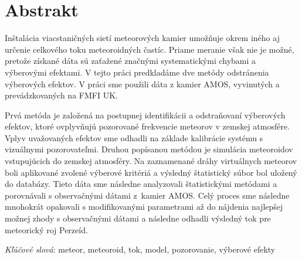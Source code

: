 \section*{Abstrakt}
    Inštalácia viacstaničných sietí meteorových kamier umožňuje okrem iného aj určenie celkového toku meteoroidných častíc.
    Priame meranie však nie je možné, pretože získané dáta sú zaťažené značnými systematickými chybami a výberovými efektami.
    V tejto práci predkladáme dve metódy odstránenia výberových efektov.
    V práci sme použili dáta z kamier AMOS, vyvinutých a prevádzkovaných na FMFI UK.

    Prvá metóda je založená na postupnej identifikácii a odstraňovaní výberových efektov,
    ktoré ovplyvňujú pozorované frekvencie meteorov v zemskej atmosfére.
    Vplyv uvažovaných efektov sme odhadli na základe kalibrácie systému s vizuálnymi pozorovateľmi.
    Druhou popísanou metódou je simulácia meteoroidov vstupujúcich do zemskej atmosféry.
    Na zaznamenané dráhy virtuálnych meteorov boli aplikované zvolené výberové kritériá
    a výsledný štatistický súbor bol uložený do databázy. Tieto dáta sme následne
    analyzovali štatistickými metódami a porovnávali s observačnými dátami z~kamier AMOS.
    Celý proces sme následne mnohokrát opakovali s modifikovanými parametrami
    až do nájdenia najlepšej možnej zhody s observačnými dátami
    a následne odhadli výsledný tok pre meteorický roj Perzeíd.

    \emph{Kľúčové slová}: meteor, meteoroid, tok, model, pozorovanie, výberové efekty
